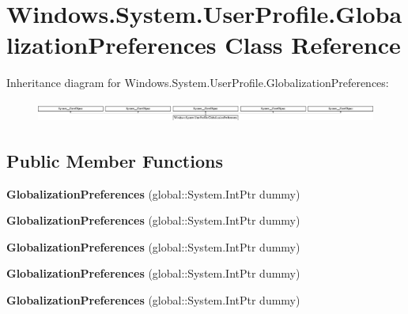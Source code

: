 \hypertarget{class_windows_1_1_system_1_1_user_profile_1_1_globalization_preferences}{}\section{Windows.\+System.\+User\+Profile.\+Globalization\+Preferences Class Reference}
\label{class_windows_1_1_system_1_1_user_profile_1_1_globalization_preferences}
Inheritance diagram for Windows.\+System.\+User\+Profile.\+Globalization\+Preferences\+:\begin{figure}[H]
\begin{center}
\leavevmode
\includegraphics[height=0.685015cm]{class_windows_1_1_system_1_1_user_profile_1_1_globalization_preferences}
\end{center}
\end{figure}
\subsection*{Public Member Functions}
\begin{DoxyCompactItemize}
\item 
\mbox{\label{class_windows_1_1_system_1_1_user_profile_1_1_globalization_preferences_a57db5f72853d87fe4429c3023b35875e}} 
{\bfseries Globalization\+Preferences} (global\+::\+System.\+Int\+Ptr dummy)
\item 
\mbox{\label{class_windows_1_1_system_1_1_user_profile_1_1_globalization_preferences_a57db5f72853d87fe4429c3023b35875e}} 
{\bfseries Globalization\+Preferences} (global\+::\+System.\+Int\+Ptr dummy)
\item 
\mbox{\label{class_windows_1_1_system_1_1_user_profile_1_1_globalization_preferences_a57db5f72853d87fe4429c3023b35875e}} 
{\bfseries Globalization\+Preferences} (global\+::\+System.\+Int\+Ptr dummy)
\item 
\mbox{\label{class_windows_1_1_system_1_1_user_profile_1_1_globalization_preferences_a57db5f72853d87fe4429c3023b35875e}} 
{\bfseries Globalization\+Preferences} (global\+::\+System.\+Int\+Ptr dummy)
\item 
\mbox{\label{class_windows_1_1_system_1_1_user_profile_1_1_globalization_preferences_a57db5f72853d87fe4429c3023b35875e}} 
{\bfseries Globalization\+Preferences} (global\+::\+System.\+Int\+Ptr dummy)
\end{DoxyCompactItemize}
